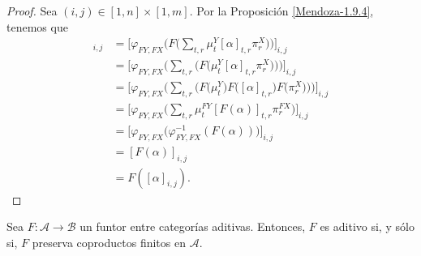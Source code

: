 \documentclass[tesis]{subfiles}
\begin{document}
\begin{proof}

    Sea $(i,j)\in[1,n]\times[1,m]$. Por la Proposición \ref{Mendoza-1.9.4}, tenemos que
    \begin{align*}
        [\varphi_{FY,FX}(F(\overline{\alpha}))]_{i,j} &= \bigg[\varphi_{FY,FX}\bigg(F\bigg( \sum_{t,r} \mu_t^Y [\alpha]_{t,r} \pi_r^X \bigg)\bigg) \bigg]_{i,j} \\
                                                      &= \bigg[ \varphi_{FY,FX} \bigg( \sum_{t,r} \bigg( F \big( \mu_t^Y [\alpha]_{t,r} \pi_r^X \big) \bigg) \bigg) \bigg]_{i,j} \tag{$F$ es aditivo} \\
                                                      &= \bigg[ \varphi_{FY,FX} \bigg( \sum_{t,r} \bigg( F \big( \mu_t^Y \big) F\big( [\alpha]_{t,r} \big) F \big( \pi_r^X \big) \bigg) \bigg) \bigg]_{i,j} \\
                                                      &= \bigg[ \varphi_{FY,FX} \bigg( \sum_{t,r} \mu_t^{FY} [F(\alpha)]_{t,r} \pi_r^{FX} \bigg) \bigg]_{i,j} \tag{$F$ preserva coproductos} \\
                                                      &= \big[ \varphi_{FY,FX} \big( \varphi^{-1}_{FY,FX} (F(\alpha)) \big) \big]_{i,j} \\
                                                      &= [F(\alpha)]_{i,j} \\
                                                      &= F([\alpha]_{i,j}).
    \end{align*}
\end{proof}

\begin{Teo}\label{Mendoza-1.10.2}
    Sea $F:\mathscr{A}\to \mathscr{B}$ un funtor entre categorías aditivas. Entonces, $F$ es aditivo si, y sólo si, $F$ preserva coproductos finitos en $\mathscr{A}$.
\end{Teo}
\end{document}
